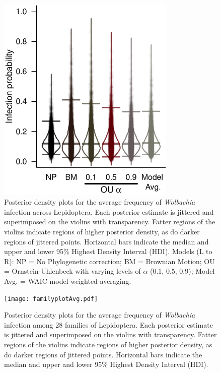 \documentclass{frontiersSCNS}
\begin{document}
\begin{figure}[h!]
  \begin{center}
    \includegraphics[width=85mm]{infection_Prob.pdf}
    \caption{Posterior density plots for the average frequency of \textit{Wolbachia} infection across Lepidoptera. Each posterior estimate is jittered and superimposed on the violins with transparency. Fatter regions of the  violins indicate regions of higher posterior density, as do darker regions of jittered points. Horizontal bars indicate the median and upper and lower 95\% Highest Density Interval (HDI).  Models (L to R): NP = No Phylogenetic correction; BM = Brownian Motion; OU = Ornstein-Uhlenbeck with varying levels of $\alpha$ (0.1, 0.5, 0.9); Model Avg. = WAIC model weighted averaging.}
 \label{grand}
  \end{center}
\end{figure}

\newpage 

\begin{figure}[h!]
  \begin{center}
    \texttt{[image: familyplotAvg.pdf]}
    \caption{Posterior density plots for the average frequency of \textit{Wolbachia} infection among 28 families of Lepidoptera. Each posterior estimate is jittered and superimposed on the violins with transparency. Fatter regions of the  violins indicate regions of higher posterior density, as do darker regions of jittered points. Horizontal bars indicate the median and upper and lower 95\% Highest Density Interval (HDI).}
 \label{familyplot}
  \end{center}
\end{figure}
\newpage
\end{document}
